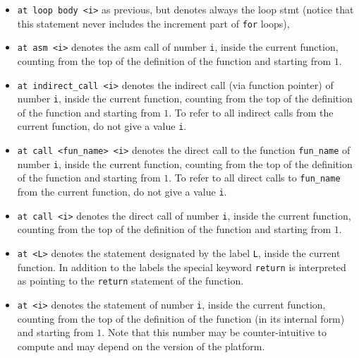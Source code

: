 \documentclass{frama-c-book}
\begin{document}
\begin{itemize}
    (notice that this statement never includes the initializer part of
    \verb|for| loops),
  \item \verb|at loop body <i>| as previous, but denotes always the loop stmt
    (notice that this statement never includes the increment part of \verb|for|
    loops),
  \item \verb|at asm <i>| denotes the asm call of number \verb|i|,
     inside the current function, counting from the top of the definition
    of the function and starting from $1$.
  \item \verb|at indirect_call <i>| denotes the indirect call (via function pointer) of number \verb|i|,
    inside the current function, counting from the top of the definition
    of the function and starting from $1$.
    To refer to all indirect calls from the current function, do not give a value \verb|i|.
  \item \verb|at call <fun_name> <i>| denotes the direct call to the function \verb|fun_name| of number \verb|i|,
    inside the current function, counting from the top of the definition
    of the function and starting from $1$.
    To refer to all direct calls to  \verb|fun_name| from the current function, do not give a value \verb|i|.
  \item \verb|at call <i>| denotes the direct call of number \verb|i|,
    inside the current function, counting from the top of the definition
    of the function and starting from $1$.
  \item \verb|at <L>| denotes the statement designated by the \C label
    \verb|L|, inside the current function. In addition to the \C
    labels the special keyword \verb|return| is interpreted as
    pointing to the \verb|return| statement of the \C function.
  \item \verb|at <i>| denotes the statement of number \verb|i|, inside
    the current function, counting from the top of the definition of the
    function (in its internal form) and starting from $1$. Note that
    this number may be counter-intuitive to compute and may
    depend on the version of the \FramaC platform.
\end{itemize}
\end{document}
